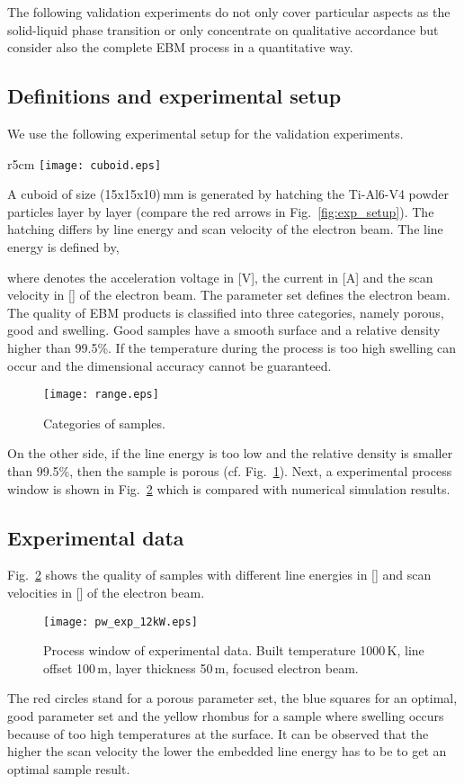 The following validation experiments do not only cover particular aspects as the solid-liquid phase transition or only concentrate 
on qualitative accordance but consider also the complete EBM process in a quantitative way. 
\subsection{Definitions and experimental setup}
We use the following experimental setup for the validation experiments. 
\begin{wrapfigure}{r}{5cm}
\centering
\vspace{-13pt}
\texttt{[image: cuboid.eps]}
\caption{Experimental setup.}
\label{fig:exp_setup}
\end{wrapfigure}
A cuboid of size (15x15x10)\,mm is generated by hatching the Ti-Al6-V4 powder particles layer by layer (compare the red arrows in Fig.~\ref{fig:exp_setup}).
The hatching differs by line energy and scan velocity of the electron beam. The line energy is defined by,

where  denotes the acceleration voltage in [V],  the current in [A] and  the scan velocity in [] of the electron beam. 
The parameter set  defines the electron beam. 
The quality of EBM products is classified into three categories, namely porous, good and swelling. Good samples have a smooth surface and 
a relative density higher than 99.5\%. If the temperature during the process is too high swelling can occur and the dimensional accuracy cannot be guaranteed. 
\begin{figure}[htbp!]
\centering
\texttt{[image: range.eps]}
\caption{Categories of samples.}
\label{fig:categories}
\end{figure}
On the other side, if the line energy is too low and the relative density is smaller than
99.5\%, then the sample is porous (cf. Fig.~\ref{fig:categories}). 
Next, a experimental process window is shown in Fig.~\ref{fig:pw_real} which is compared with numerical simulation results. 

\subsection{Experimental data}
Fig.~\ref{fig:pw_real} shows the quality of samples with different line energies in [] and scan velocities in [] of the electron beam. 
\begin{figure}[htbp!]
 \centering
 \texttt{[image: pw\_exp\_12kW.eps]}
 \caption{Process window of experimental data. Built temperature 1000\,K, line offset 100\,m, layer thickness 50\,m, focused electron beam.}
 \label{fig:pw_real}
\end{figure}
The red circles stand for a porous parameter set, the blue squares for an optimal, good parameter set and the yellow rhombus for a sample where 
swelling occurs because of too high temperatures at the surface. It can be observed that the higher the scan velocity the lower the embedded line energy has to be to get an optimal sample
result. 

